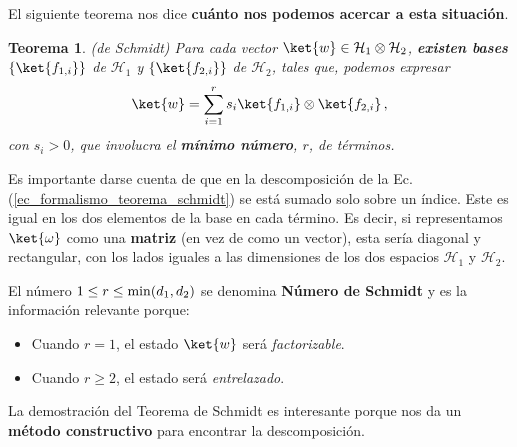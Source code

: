 \documentclass[a4paper,11pt]{book} %
\newtheorem{teorema_contador}{Teorema}
\newcommand{\Teorema}[1]{
		\begin{mybox_gray2}{}
			\begin{teorema_contador}
				 #1 
			\end{teorema_contador} 
		\end{mybox_gray2}
	}
\numberwithin{equation}{chapter}
\begin{document}
El siguiente teorema nos dice \textbf{cuánto nos podemos acercar a esta situación}.

	\Teorema{ (\textit{de Schmidt)} 
	Para cada vector $\ket{w}\in \mathcal{H}_1\otimes \mathcal{H}_2$, \textbf{existen  bases } $\{\ket{f_{1,i}}\}$  de $\mathcal{H}_1$ y  $\{\ket{f_{2,i}}\}$  de $\mathcal{H}_2$, tales que, podemos expresar 
		\begin{equation} \label{ec_formalismo_teorema_schmidt}
		\ket{w} = \sum_{i=1}^r s_i \ket{f_{1,i}}\otimes\ket{f_{2,i}} \, ,
		\end{equation}
	 con $s_i>0$, que   involucra el \textbf{mínimo número}, $r$, de términos.
	}

Es importante darse cuenta de que en la descomposición de la Ec. (\ref{ec_formalismo_teorema_schmidt}) se está sumado solo sobre un índice. Este es igual en los dos elementos de la base en cada término. Es decir, si representamos $\ket{\omega}$ como una \textbf{matriz} (en vez de como un vector), esta sería diagonal y rectangular, con los lados iguales a las dimensiones de los dos espacios $\mathcal{H}_1$ y $\mathcal{H}_2$.

El número $1\leq r\leq {\rm min}(d_1,d_2)$ se denomina \textbf{Número de Schmidt} y  es la información relevante  porque:
\begin{itemize}
	\item Cuando $r=1$, el estado $\ket{w}$ será \textit{factorizable}.
	\item Cuando $r\geq 2$, el estado será \textit{entrelazado}.
\end{itemize}

	La demostración del Teorema de Schmidt es interesante porque nos da un \textbf{método constructivo} para encontrar la descomposición. 
\end{document}
